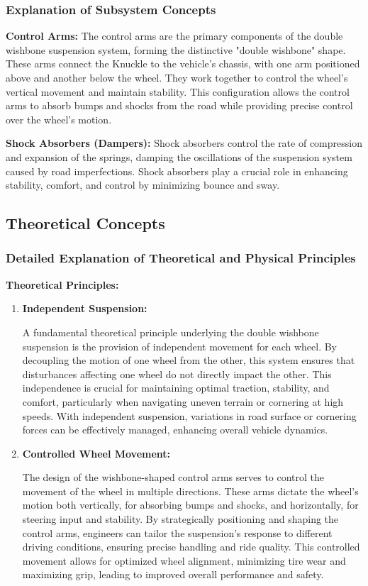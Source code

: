 \subsubsection{Explanation of Subsystem Concepts}
\textbf{Control Arms:} The control arms are the primary components of the double wishbone suspension system, forming the distinctive "double wishbone" shape. These arms connect the Knuckle to the vehicle's chassis, with one arm positioned above and another below the wheel. They work together to control the wheel's vertical movement and maintain stability. This configuration allows the control arms to absorb bumps and shocks from the road while providing precise control over the wheel's motion.

\textbf{Shock Absorbers (Dampers):} Shock absorbers control the rate of compression and expansion of the springs, damping the oscillations of the suspension system caused by road imperfections. Shock absorbers play a crucial role in enhancing stability, comfort, and control by minimizing bounce and sway.

\newpage
\subsection{Theoretical Concepts}
\subsubsection{Detailed Explanation of Theoretical and Physical Principles}
\textbf{Theoretical Principles:}

\begin{enumerate}
    \item \textbf{Independent Suspension:}
    
    A fundamental theoretical principle underlying the double wishbone suspension is the provision of independent movement for each wheel. By decoupling the motion of one wheel from the other, this system ensures that disturbances affecting one wheel do not directly impact the other. This independence is crucial for maintaining optimal traction, stability, and comfort, particularly when navigating uneven terrain or cornering at high speeds. With independent suspension, variations in road surface or cornering forces can be effectively managed, enhancing overall vehicle dynamics.
    
\item \textbf{Controlled Wheel Movement:}
    
    The design of the wishbone-shaped control arms serves to control the movement of the wheel in multiple directions. These arms dictate the wheel's motion both vertically, for absorbing bumps and shocks, and horizontally, for steering input and stability. By strategically positioning and shaping the control arms, engineers can tailor the suspension's response to different driving conditions, ensuring precise handling and ride quality. This controlled movement allows for optimized wheel alignment, minimizing tire wear and maximizing grip, leading to improved overall performance and safety.
\end{enumerate}

